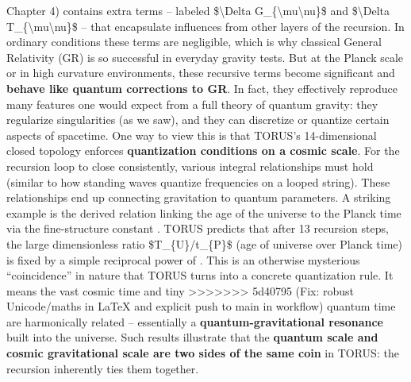 \documentclass[]{article}
\begin{document}
Chapter 4) contains extra terms -- labeled \$\textbackslash{}Delta
G\_\{\textbackslash{}mu\textbackslash{}nu\}\$ and
\$\textbackslash{}Delta T\_\{\textbackslash{}mu\textbackslash{}nu\}\$ --
that encapsulate influences from other layers of the recursion​. In
ordinary conditions these terms are negligible, which is why classical
General Relativity (GR) is so successful in everyday gravity tests. But
at the Planck scale or in high curvature environments, these recursive
terms become significant and \textbf{behave like quantum corrections to
GR}. In fact, they effectively reproduce many features one would expect
from a full theory of quantum gravity: they regularize singularities (as
we saw), and they can discretize or quantize certain aspects of
spacetime. One way to view this is that TORUS's 14-dimensional closed
topology enforces \textbf{quantization conditions on a cosmic scale}.
For the recursion loop to close consistently, various integral
relationships must hold (similar to how standing waves quantize
frequencies on a looped string). These relationships end up connecting
gravitation to quantum parameters. A striking example is the derived
relation linking the age of the universe to the Planck time via the
fine-structure constant \alpha. TORUS predicts that after 13 recursion steps,
the large dimensionless ratio \$T\_\{U\}/t\_\{P\}\$ (age of universe
over Planck time) is fixed by a simple reciprocal power of \alpha​. This is
an otherwise mysterious ``coincidence'' in nature that TORUS turns into
a concrete quantization rule. It means the vast cosmic time and tiny
>>>>>>> 5d40795 (Fix: robust Unicode/maths in LaTeX and explicit push to main in workflow)
quantum time are harmonically related -- essentially a
\textbf{quantum-gravitational resonance} built into the universe. Such
results illustrate that the \textbf{quantum scale and cosmic
gravitational scale are two sides of the same coin} in TORUS: the
recursion inherently ties them together.
\end{document}
